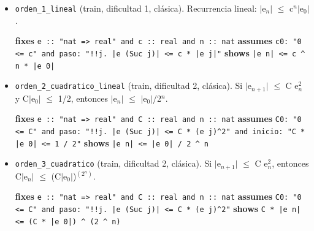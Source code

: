 \documentclass[11pt,a4paper]{article}
\begin{document}
\begin{itemize}
  \item \texttt{orden\_\allowbreak{}1\_\allowbreak{}lineal} (train, dificultad 1, clásica). Recurrencia lineal: $|$e$_{n}|$ $\le $ c$^{n}|$e$_{0}|$.\\
  {\footnotesize \textbf{fixes} \texttt{e :\allowbreak{}:\allowbreak{} "nat =\allowbreak{}> real" and c :\allowbreak{}:\allowbreak{} real and n :\allowbreak{}:\allowbreak{} nat} \textbf{assumes} \texttt{c0:\allowbreak{} "0 <=\allowbreak{} c" and paso:\allowbreak{} "!{}!j. |\allowbreak{}e (\allowbreak{}Suc j)|\allowbreak{} <=\allowbreak{} c *\allowbreak{} |\allowbreak{}e j|\allowbreak{}"} \textbf{shows} \texttt{|\allowbreak{}e n|\allowbreak{} <=\allowbreak{} c \textasciicircum{} n *\allowbreak{} |\allowbreak{}e 0|\allowbreak{}}\par}
  \item \texttt{orden\_\allowbreak{}2\_\allowbreak{}cuadratico\_\allowbreak{}lineal} (train, dificultad 2, clásica). Si $|$e$_{n+1}|$ $\le $ C e$_{n}^{2}$ y C$|$e$_{0}|$ $\le $ 1/2, entonces $|$e$_{n}|$ $\le $ $|$e$_{0}|$/2$^{n}$.\\
  {\footnotesize \textbf{fixes} \texttt{e :\allowbreak{}:\allowbreak{} "nat =\allowbreak{}> real" and C :\allowbreak{}:\allowbreak{} real and n :\allowbreak{}:\allowbreak{} nat} \textbf{assumes} \texttt{C0:\allowbreak{} "0 <=\allowbreak{} C" and paso:\allowbreak{} "!{}!j. |\allowbreak{}e (\allowbreak{}Suc j)|\allowbreak{} <=\allowbreak{} C *\allowbreak{} (\allowbreak{}e j)\textasciicircum{}2" and inicio:\allowbreak{} "C *\allowbreak{} |\allowbreak{}e 0|\allowbreak{} <=\allowbreak{} 1 /\allowbreak{} 2"} \textbf{shows} \texttt{|\allowbreak{}e n|\allowbreak{} <=\allowbreak{} |\allowbreak{}e 0|\allowbreak{} /\allowbreak{} 2 \textasciicircum{} n}\par}
  \item \texttt{orden\_\allowbreak{}3\_\allowbreak{}cuadratico} (train, dificultad 2, clásica). Si $|$e$_{n+1}|$ $\le $ C e$_{n}^{2}$, entonces C$|$e$_{n}|$ $\le $ (C$|$e$_{0}|$)$^{(2^{n})}$.\\
  {\footnotesize \textbf{fixes} \texttt{e :\allowbreak{}:\allowbreak{} "nat =\allowbreak{}> real" and C :\allowbreak{}:\allowbreak{} real and n :\allowbreak{}:\allowbreak{} nat} \textbf{assumes} \texttt{C0:\allowbreak{} "0 <=\allowbreak{} C" and paso:\allowbreak{} "!{}!j. |\allowbreak{}e (\allowbreak{}Suc j)|\allowbreak{} <=\allowbreak{} C *\allowbreak{} (\allowbreak{}e j)\textasciicircum{}2"} \textbf{shows} \texttt{C *\allowbreak{} |\allowbreak{}e n|\allowbreak{} <=\allowbreak{} (\allowbreak{}C *\allowbreak{} |\allowbreak{}e 0|\allowbreak{}) \textasciicircum{} (\allowbreak{}2 \textasciicircum{} n)}\par}
\end{itemize}
\end{document}
